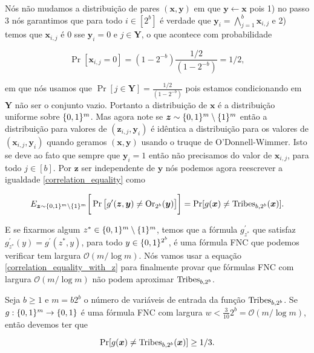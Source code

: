 Nós não mudamos a distribuição de pares $(\boldsymbol{x}, \boldsymbol{y})$ em que $\boldsymbol{y} \leftarrow \boldsymbol{x}$ pois 1) no passo 3 nós garantimos que para todo $i \in [2^{b}]$ é verdade que $\boldsymbol{y}_{i} = \bigwedge_{j = 1}^{b} \boldsymbol{x}_{i, j}$ e 2) temos que $\boldsymbol{x}_{i, j}$ é 0 sse $\boldsymbol{y}_{i} = 0$ e $j \in \boldsymbol{Y}$, o que acontece com probabilidade

\begin{equation*}
    \Pr[\boldsymbol{x}_{i, j} = 0] = (1 - 2^{-b})\frac{1/2}{(1 - 2^{-b})} = 1/2,
\end{equation*}

em que nós usamos que $\Pr[j \in \boldsymbol{Y}] = \frac{1/2}{(1 - 2^{-b})}$ pois estamos condicionando em $\boldsymbol{Y}$ não ser o conjunto vazio. Portanto a distribuição de $\boldsymbol{x}$ é a distribuição uniforme sobre $\{0, 1\}^{m}$. Mas agora note se $\boldsymbol{z} \sim \{0, 1\}^{m}\setminus \{1\}^{m}$ então a distribuição para valores de $(\boldsymbol{z}_{i, j}, \boldsymbol{y}_{i})$ é idêntica a distribuição para os valores de $(\boldsymbol{x}_{i, j}, \boldsymbol{y}_{i})$ quando geramos $(\boldsymbol{x}, \boldsymbol{y})$ usando o truque de O'Donnell-Wimmer. Isto se deve ao fato que sempre que $\boldsymbol{y}_{i} = 1$ então não precisamos do valor de $\boldsymbol{x}_{i, j}$, para todo $j \in [b]$. Por $\boldsymbol{z}$ ser independente de $\boldsymbol{y}$ nós podemos agora reescrever a igualdade \ref{correlation_equality} como

\begin{equation} \label{correlation_equality_with_z}
    E_{\boldsymbol{z} \sim \{0, 1\}^{m}\setminus\{1\}^{m}} \bigg[ \Pr \big[g^{\prime}(\boldsymbol{z}, \boldsymbol{y}) \neq \text{Or}_{2^{b}}(\boldsymbol{y}) \big] \bigg] = \Pr[g(\boldsymbol{x}) \neq \text{Tribes}_{b, 2^{b}}(\boldsymbol{x})].
\end{equation}

E se fixarmos algum $z^{*} \in \{0, 1\}^{m} \setminus \{1\}^{m}$, temos que a fórmula $g_{z^{*}}^{\prime}$ que satisfaz $g_{z^{*}}^{\prime}(y) = g^{\prime}(z^{*}, y)$, para todo $y \in \{0, 1\}^{2^{b}}$, é uma fórmula FNC que podemos verificar tem largura $\mathcal{O}(m/\log m)$. Nós vamos usar a equação \ref{correlation_equality_with_z} para finalmente provar que fórmulas FNC com largura $\mathcal{O}(m/\log m)$ não podem aproximar $\text{Tribes}_{b, 2^{b}}$.

\begin{teo} \label{tribes_width_lb}

Seja $b \geq 1$ e $m = b2^{b}$ o número de variáveis de entrada da função $\text{Tribes}_{b, 2^{b}}$. Se $g: \{0, 1\}^{m} \to \{0, 1\}$ é uma fórmula FNC com largura $w < \frac{3}{10}2^{b} = \mathcal{O}(m/\log m)$, então devemos ter que

\begin{equation*}
    \Pr[g(\boldsymbol{x}) \neq \text{Tribes}_{b, 2^{b}}(\boldsymbol{x})] \geq 1/3.
\end{equation*}

\end{teo}

